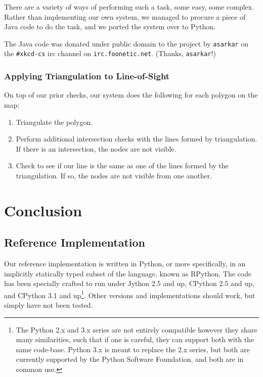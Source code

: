 \documentclass[letterpaper, 12pt]{article}
\begin{document}
\begin{multicols}{2}
There are a variety of ways of performing such a task, some easy, some complex.
Rather than implementing our own system, we managed to procure a piece of Java
code to do the task, and we ported the system over to Python.

The Java code was donated under public domain to the project by \texttt{asarkar}
on the \texttt{\#xkcd-cs} irc channel on \texttt{irc.foonetic.net}. (Thanks,
\texttt{asarkar}!)

\subsubsection{Applying Triangulation to Line-of-Sight}

On top of our prior checks, our system does the following for each polygon on
the map:

\begin{enumerate}
    \item Triangulate the polygon.
    \item Perform additional intersection checks with the lines formed by
          triangulation. If there is an intersection, the nodes are not visible.
    \item Check to see if our line is the same as one of the lines formed by the
          triangulation. If so, the nodes are not visible from one another.
\end{enumerate}

\section{Conclusion}

\subsection{Reference Implementation}

Our reference implementation is written in Python, or more specifically, in an
implicitly statically typed subset of the language, known as RPython. The code
has been specially crafted to run under Jython 2.5 and up, CPython 2.5 and up,
and CPython 3.1 and up\footnote{The Python 2.x and 3.x series are not entirely
compatible however they share many similarities, such that if one is careful,
they can support both with the same code-base. Python 3.x is meant to replace
the 2.x series, but both are currently supported by the Python Software
Foundation, and both are in common use.}. Other versions and implementations
should work, but simply have not been tested.


\end{multicols}
\end{document}
